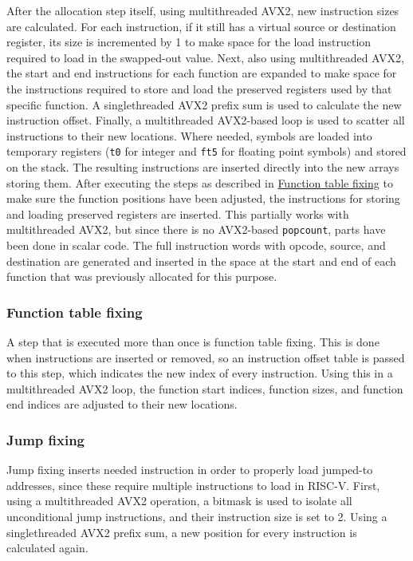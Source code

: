 \documentclass[12pt,dvipsnames]{article}
\newcommand{\mono}[1]{\texttt{#1}}
\begin{document}
After the allocation step itself, using multithreaded AVX2, new instruction sizes are calculated. For each instruction, if it still has a virtual source or destination register, its size is incremented by 1 to make space for the load instruction required to load in the swapped-out value. Next, also using multithreaded AVX2, the start and end instructions for each function are expanded to make space for the instructions required to store and load the preserved registers used by that specific function. A singlethreaded AVX2 prefix sum is used to calculate the new instruction offset. Finally, a multithreaded AVX2-based loop is used to scatter all instructions to their new locations. Where needed, symbols are loaded into temporary registers (\mono{t0} for integer and \mono{ft5} for floating point symbols) and stored on the stack. The resulting instructions are inserted directly into the new arrays storing them. After executing the steps as described in \hyperref[functab]{Function table fixing} to make sure the function positions have been adjusted, the instructions for storing and loading preserved registers are inserted. This partially works with multithreaded AVX2, but since there is no AVX2-based \mono{popcount}, parts have been done in scalar code. The full instruction words with opcode, source, and destination are generated and inserted in the space at the start and end of each function that was previously allocated for this purpose.

\subsubsection*{Function table fixing} \label{functab}
A step that is executed more than once is function table fixing. This is done when instructions are inserted or removed, so an instruction offset table is passed to this step, which indicates the new index of every instruction. Using this in a multithreaded AVX2 loop, the function start indices, function sizes, and function end indices are adjusted to their new locations.

\subsubsection{Jump fixing}
Jump fixing inserts needed instruction in order to properly load jumped-to addresses, since these require multiple instructions to load in RISC-V. First, using a multithreaded AVX2 operation, a bitmask is used to isolate all unconditional jump instructions, and their instruction size is set to 2. Using a singlethreaded AVX2 prefix sum, a new position for every instruction is calculated again.
\end{document}
